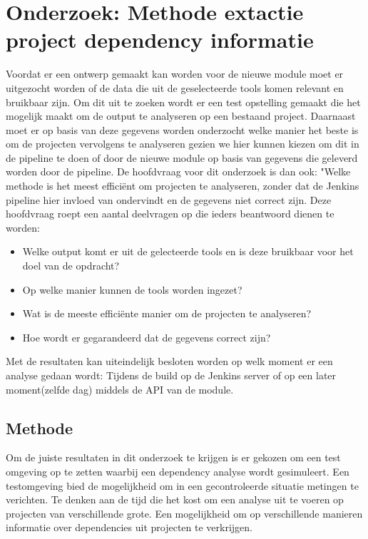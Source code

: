 
\chapter{Onderzoek: Methode extactie project dependency informatie}\label{ch:onderzoek:-methode-extactie-project-dependency-informatie}
Voordat er een ontwerp gemaakt kan worden voor de nieuwe module moet er uitgezocht worden of de data die uit de geselecteerde tools komen relevant en bruikbaar zijn. Om dit uit te zoeken wordt er een test opstelling gemaakt die het mogelijk maakt om de output te analyseren op een bestaand project. Daarnaast moet er op basis van deze gegevens worden onderzocht welke manier het beste is om de projecten vervolgens te analyseren gezien we hier kunnen kiezen om dit in de pipeline te doen of door de nieuwe module op basis van gegevens die geleverd worden door de pipeline. De hoofdvraag voor dit onderzoek is dan ook: "Welke methode is het meest efficiënt om projecten te analyseren, zonder dat de Jenkins pipeline hier invloed van ondervindt en de gegevens niet correct zijn. Deze hoofdvraag roept een aantal deelvragen op die ieders beantwoord dienen te worden:
\begin{itemize}
    \item Welke output komt er uit de gelecteerde tools en is deze bruikbaar voor het doel van de opdracht?
    \item Op welke manier kunnen de tools worden ingezet?
    \item Wat is de meeste efficiënte manier om de projecten te analyseren?
    \item Hoe wordt er gegarandeerd dat de gegevens correct zijn?
\end{itemize}
Met de resultaten kan uiteindelijk besloten worden op welk moment er een analyse gedaan wordt: Tijdens de build op de Jenkins server of op een later moment(zelfde dag) middels de API van de module.

\section{Methode}\label{sec:methode}
Om de juiste resultaten in dit onderzoek te krijgen is er gekozen om een test omgeving op te zetten waarbij een dependency analyse wordt gesimuleert. Een testomgeving bied de mogelijkheid om in een gecontroleerde situatie metingen te verichten. Te denken aan de tijd die het kost om een analyse uit te voeren op projecten van verschillende grote. Een mogelijkheid om op verschillende manieren informatie over dependencies uit projecten te verkrijgen.
